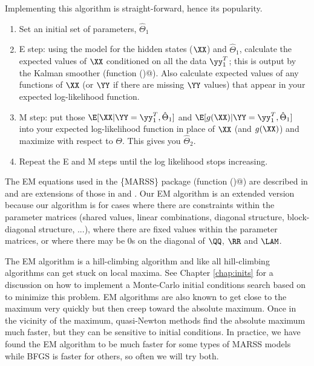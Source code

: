 Implementing this algorithm is straight-forward, hence its popularity.
\begin{enumerate}
	\item Set an initial set of parameters, $\hat{\Theta}_1$
	\item E step: using the model for the hidden states ($\XX$) and $\hat{\Theta}_1$, calculate the expected values of $\XX$ conditioned on all the data $\yy_1^T$; this is \verb@xtT@ output by the Kalman smoother (function \verb@MARSSkf()@).  Also calculate expected values of any functions of $\XX$ (or $\YY$ if there are missing $\YY$ values) that appear in your expected log-likelihood function.
	\item M step: put those $\E[\XX | \YY=\yy_1^T, \hat{\Theta}_1]$ and $\E[g(\XX) | \YY=\yy_1^T, \hat{\Theta}_1]$ into your expected log-likelihood function in place of $\XX$ (and $g(\XX)$) and maximize with respect to $\Theta$.  This gives you $\hat{\Theta}_2$.
	\item Repeat the E and M steps until the log likelihood stops increasing.
\end{enumerate}

The EM equations used in the \{MARSS\} package (function \verb@MARSSkem()@) are described in \citet{Holmes2010} and are extensions of those in \citet{ShumwayStoffer1982} and \citet{GhahramaniHinton1996}.  Our EM algorithm is an extended version because our algorithm is for cases where there are constraints within the parameter matrices (shared values, linear combinations, diagonal structure, block-diagonal structure, ...), where there are fixed values within the parameter matrices, or where there may be 0s on the diagonal of $\QQ$, $\RR$ and $\LAM$.

The EM algorithm is a hill-climbing algorithm and like all hill-climbing algorithms can get stuck on local maxima.  See Chapter \ref{chap:inits} for a discussion on how to implement a Monte-Carlo initial conditions search based on \citet{Biernackietal2003} to minimize this problem.  EM algorithms are also known to get close to the maximum very quickly but then creep toward the absolute maximum.  Once in the vicinity of the maximum, quasi-Newton methods find the absolute maximum much faster, but they can be  sensitive to initial conditions. In practice, we have found the EM algorithm to be much faster for some types of MARSS models while BFGS is faster for others, so often we will try both.

